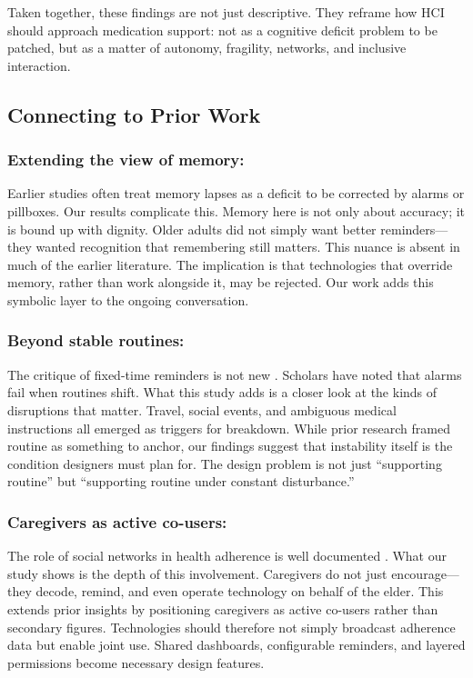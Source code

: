 \documentclass[acmlarge]{acmart}
\begin{document}
Taken together, these findings are not just descriptive. They reframe
how HCI should approach medication support: not as a cognitive deficit
problem to be patched, but as a matter of autonomy, fragility, networks,
and inclusive interaction.

\subsection{Connecting to Prior Work}
\subsubsection{Extending the view of memory: }
Earlier studies often treat memory lapses as a deficit to be corrected
by alarms or pillboxes. Our results complicate this. Memory here is not
only about accuracy; it is bound up with dignity. Older adults did not
simply want better reminders---they wanted recognition that remembering
still matters. This nuance is absent in much of the earlier literature.
The implication is that technologies that override memory, rather than
work alongside it, may be rejected. Our work adds this symbolic layer to
the ongoing conversation.

\subsubsection{Beyond stable routines: }
The critique of fixed-time reminders is not new \cite{10.1145/3636534.3698116}. Scholars have
noted that alarms fail when routines shift. What this study adds is a
closer look at the kinds of disruptions that matter. Travel, social
events, and ambiguous medical instructions all emerged as triggers for
breakdown. While prior research framed routine as something to anchor,
our findings suggest that instability itself is the condition designers
must plan for. The design problem is not just ``supporting routine'' but
``supporting routine under constant disturbance.''

\subsubsection{Caregivers as active co-users: }
The role of social networks in health adherence is well documented
\cite{10.1145/3610029}. What our study shows is the depth of this
involvement. Caregivers do not just encourage---they decode, remind, and
even operate technology on behalf of the elder. This extends prior
insights by positioning caregivers as active co-users rather than
secondary figures. Technologies should therefore not simply broadcast
adherence data but enable joint use. Shared dashboards, configurable
reminders, and layered permissions become necessary design features.
\end{document}
